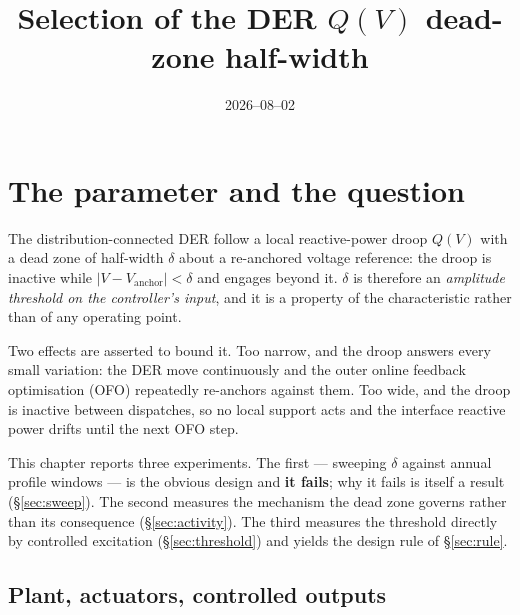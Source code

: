 \documentclass[11pt,a4paper]{article}
\title{Selection of the DER $Q(V)$ dead-zone half-width}
\author{}
\date{2026--08--02}
\newcommand{\dz}{\ensuremath{\delta}}
\begin{document}
\maketitle
\tableofcontents

\section{The parameter and the question}

The distribution-connected DER follow a local reactive-power droop $Q(V)$ with a
dead zone of half-width $\dz$ about a re-anchored voltage reference: the droop
is inactive while $|V-V_\mathrm{anchor}| < \dz$ and engages beyond it. $\dz$ is
therefore an \emph{amplitude threshold on the controller's input}, and it is a
property of the characteristic rather than of any operating point.

Two effects are asserted to bound it. Too narrow, and the droop answers every
small variation: the DER move continuously and the outer online feedback
optimisation (OFO) repeatedly re-anchors against them. Too wide, and the droop
is inactive between dispatches, so no local support acts and the interface
reactive power drifts until the next OFO step.

This chapter reports three experiments. The first --- sweeping $\dz$ against
annual profile windows --- is the obvious design and \textbf{it fails}; why it
fails is itself a result (\S\ref{sec:sweep}). The second measures the mechanism
the dead zone governs rather than its consequence (\S\ref{sec:activity}). The
third measures the threshold directly by controlled excitation
(\S\ref{sec:threshold}) and yields the design rule of \S\ref{sec:rule}.

\subsection{Plant, actuators, controlled outputs}
\end{document}
